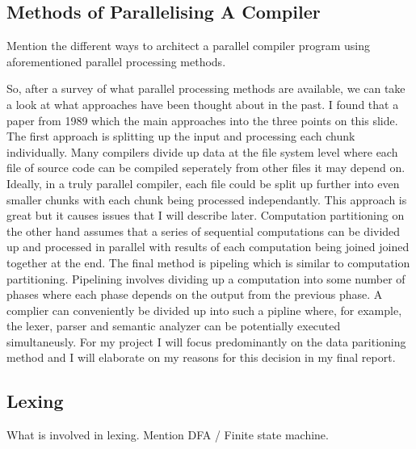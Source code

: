 \subsection{Methods of Parallelising A Compiler} \label{compiler_parallel_methods}
\begin{sectionplan}
    Mention the different ways to architect a parallel compiler program using
aforementioned parallel processing methods.
\end{sectionplan}
\cite{hillis_data_1986, gross_parallel_1989, jena_design_2018, baer_model_1977}

\begin{roughwork}

	So, after a survey of what parallel processing methods are available, we can
	take a look at what approaches have been thought about in the past. I found
	that a paper from 1989 which the main approaches into the three points on this
	slide. The first approach is splitting up the input and processing each chunk
	individually. Many compilers divide up data at the file system level where each
	file of source code can be compiled seperately from other files it may depend
	on. Ideally, in a truly parallel compiler, each file could be split up further
	into even smaller chunks with each chunk being processed independantly. This
	approach is great but it causes issues that I will describe later. Computation
	partitioning on the other hand assumes that a series of sequential computations
	can be divided up and processed in parallel with results of each computation
	being joined joined together at the end. The final method is pipeling which
	is similar to computation partitioning. Pipelining involves dividing up a
	computation into some number of phases where each phase depends on the output
	from the previous phase. A complier can conveniently be divided up into such
	a pipline where, for example, the lexer, parser and semantic analyzer can be
	potentially executed simultaneusly. For my project I will focus predominantly on
	the data paritioning method and I will elaborate on my reasons for this decision
	in my final report.

\end{roughwork}

\subsection{Lexing}
\begin{sectionplan}
    What is involved in lexing. Mention DFA / Finite state machine.
\end{sectionplan}
\cite{pai_t_systematic_2020, barve_parallel_2014, barve_parallel_2012, barve_improved_2015}

